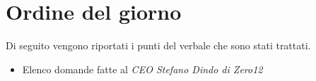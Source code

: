 \clearpage
\section{Ordine del giorno}
Di seguito vengono riportati i punti del verbale che sono stati trattati.
\begin{itemize}
	\item Elenco domande fatte al \emph{CEO Stefano Dindo di Zero12}
\end{itemize}
